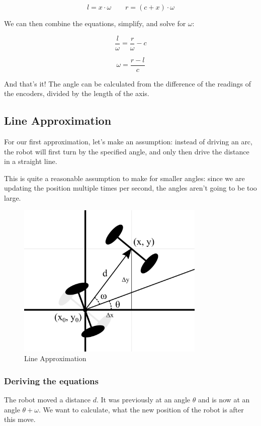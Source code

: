 \documentclass[12pt,twoside]{article}
\begin{document}
\vspace{-\parskip}\[l=x\cdot\omega\qquad r=\left(c+x\right)\cdot\omega\]

We can then combine the equations, simplify, and solve for $\omega$:

\vspace{-\parskip}\[\frac{l}{\omega} = \frac{r}{\omega} - c\]

\vspace{-\parskip}\[\omega = \frac{r - l}{c}\]

And that's it! The angle can be calculated from the difference of the readings of the encoders, divided by the length of the axis.





\subsection{Line Approximation}
For our first approximation, let's make an assumption: instead of driving an arc, the robot will first turn by the specified angle, and only then drive the distance in a straight line.

This is quite a reasonable assumption to make for smaller angles: since we are updating the position multiple times per second, the angles aren't going to be too large.

\begin{figure}[H]
\centering
\includegraphics[width=0.8\textwidth]{../assets/images/odometry/line-approximation.png}
\caption{Line Approximation}
\end{figure}

\subsubsection{Deriving the equations}
The robot moved a distance $d$. It was previously at an angle $\theta$ and is now at an angle $\theta + \omega$. We want to calculate, what the new position of the robot is after this move.
\end{document}
